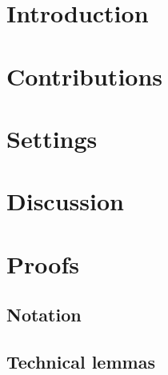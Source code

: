 




\maketitle

\begin{abstract}

\end{abstract}

\section{Introduction}



\section{Contributions} 


\section{Settings} 


\section{Discussion} \label{sec:discussion}





\tableofcontents
\newpage

\section{Proofs} \label{sec:proofs}

\subsection{Notation}


\subsection{Technical lemmas}


